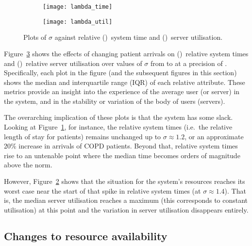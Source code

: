 \begin{figure}
    \centering
    \begin{subfigure}{.5\imgwidth}
        \texttt{[image: lambda\_time]}
        \caption{}\label{fig:lambda_time}
    \end{subfigure}\hfill%
    \begin{subfigure}{.5\imgwidth}
        \texttt{[image: lambda\_util]}
        \caption{}\label{fig:lambda_util}
    \end{subfigure}
    \caption{%
        Plots of \(\sigma\) against relative ()~system
        time and ()~server utilisation.
    }\label{fig:lambda}
\end{figure}

Figure~\ref{fig:lambda} shows the effects of changing patient arrivals on
()~relative system times and
()~relative server utilisation over values of \(\sigma\)
from  to  at a
precision of . Specifically, each plot in the
figure (and the subsequent figures in this section) shows the median and
interquartile range (IQR) of each relative attribute. These metrics provide an
insight into the experience of the average user (or server) in the system, and
in the stability or variation of the body of users (servers).

The overarching implication of these plots is that the system has some slack.
Looking at Figure~\ref{fig:lambda_time}, for instance, the relative system times
(i.e.\ the relative length of stay for patients) remains unchanged up to
\(\sigma \approx 1.2\), or an approximate 20\% increase in arrivals of COPD
patients. Beyond that, relative system times rise to an untenable point where
the median time becomes orders of magnitude above the norm.

However, Figure~\ref{fig:lambda_util} shows that the situation for the system's
resources reaches its worst case near the start of that spike in relative system
times (at \(\sigma \approx 1.4\)). That is, the median server utilisation
reaches a maximum (this corresponds to constant utilisation) at this point and
the variation in server utilisation disappears entirely.


\subsection{Changes to resource availability}\label{subsec:resources}

